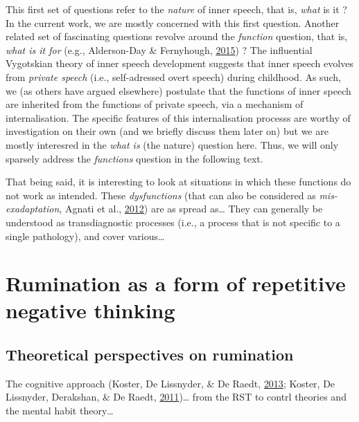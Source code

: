 \documentclass[a4paper,12pt,twoside,openright,oldfontcommands]{memoir}
\begin{document}
This first set of questions refer to the \emph{nature} of inner speech,
that is, \emph{what} is it ? In the current work, we are mostly
concerned with this first question. Another related set of fascinating
questions revolve around the \emph{function} question, that is,
\emph{what is it for} (e.g., Alderson-Day \& Fernyhough,
\protect\hyperlink{ref-alderson-day_inner_2015}{2015}) ? The influential
Vygotskian theory of inner speech development suggests that inner speech
evolves from \emph{private speech} (i.e., self-adressed overt speech)
during childhood. As such, we (as others have argued elsewhere)
postulate that the functions of inner speech are inherited from the
functions of private speech, via a mechanism of internalisation. The
specific features of this internalisation processs are worthy of
investigation on their own (and we briefly discuss them later on) but we
are mostly interesred in the \emph{what is} (the nature) question here.
Thus, we will only sparsely address the \emph{functions} question in the
following text.

That being said, it is interesting to look at situations in which these
functions do not work as intended. These \emph{dysfunctions} (that can
also be considered as \emph{mis-exadaptation}, Agnati et al.,
\protect\hyperlink{ref-agnati_possible_2012}{2012}) are as spread
as\ldots{} They can generally be understood as transdiagnostic processes
(i.e., a process that is not specific to a single pathology), and cover
various\ldots{}

\section{Rumination as a form of repetitive negative
thinking}\label{rumination-as-a-form-of-repetitive-negative-thinking}

\subsection{Theoretical perspectives on
rumination}\label{theoretical-perspectives-on-rumination}

The cognitive approach (Koster, De Lissnyder, \& De Raedt,
\protect\hyperlink{ref-Koster2013}{2013}; Koster, De Lissnyder,
Derakshan, \& De Raedt,
\protect\hyperlink{ref-Koster2011}{2011})\ldots{} from the RST to contrl
theories and the mental habit theory\ldots{}
\end{document}
